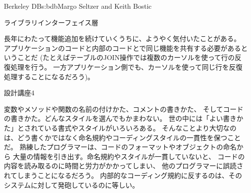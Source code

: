 \begin{aosachapter}{Berkeley DB}{s:bdb}{Margo Seltzer and Keith Bostic}
\begin{aosasect1}{ライブラリインターフェイス層}
\label{sec.bdb.int}

長年にわたって機能追加を続けていくうちに、ようやく気付いたことがある。
アプリケーションのコードと内部のコードとで同じ機能を共有する必要があるということだ
(たとえばテーブルのJOIN操作では複数のカーソルを使って行の反復処理を行う。
一方アプリケーション側でも、カーソルを使って同じ行を反復処理することになるだろう)。

\begin{aosabox}{設計講座4}

変数やメソッドや関数の名前の付けかた、コメントの書きかた、
そしてコードの書きかた。どんなスタイルを選んでもかまわない。
世の中には「よい書きかた」とされている書式やスタイルがいろいろある。
そんなことより大切なのは、どう書くかではなく命名規約やコーディングスタイルの一貫性を保つことだ。
熟練したプログラマーは、コードのフォーマットやオブジェクトの命名から
大量の情報を引き出す。命名規約やスタイルが一貫していないと、
コードの内容を読み取るのに時間と労力がかかってしまい、
他のプログラマーに誤読されてしまうことになるだろう。
内部的なコーディング規約に反するのは、そのシステムに対して発砲しているのに等しい。

\end{aosabox}


\end{aosasect1}
\end{aosachapter}
